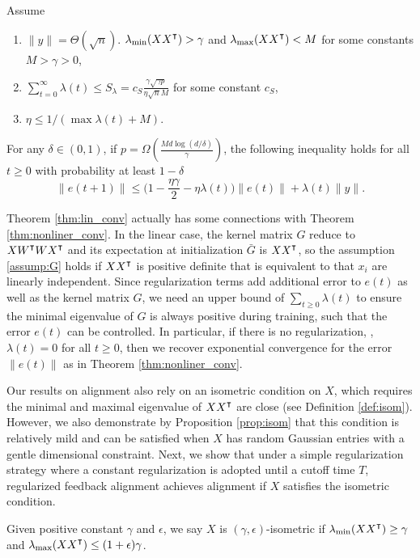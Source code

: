 \begin{theorem}
\label{thm:lin_conv}
Assume
\begin{enumerate}
\item $\|y\| = \Theta(\sqrt n)$. $\lambda_{\min}(XX\transpose)>\gamma$ and $\lambda_{\max}(XX\transpose)<M$ for some constants $M>\gamma>0$,
\item $\sum_{t=0}^\infty \lambda(t) \leq  S_\lambda = c_{S}\frac{\gamma\sqrt{\gamma p}}{\eta\sqrt{n}M}$ for some constant $c_{S}$,
\item $\eta \leq 1/(\max \lambda(t)+M)$.
\end{enumerate}
For any $\delta\in(0,1)$, if $p = \Omega(\frac{Md\log(d/\delta)}{\gamma})$, the following inequality holds for all $t\geq 0$ with probability at least $1-\delta$
\begin{equation}
\label{eq:reg_error_bd}
\|e(t+1)\|\leq \big(1-\frac{\eta\gamma}{2}-\eta\lambda(t)\big)\|e(t)\| + \lambda(t)\|y\|.
\end{equation} 
\end{theorem}

Theorem \ref{thm:lin_conv} actually has some connections with Theorem \ref{thm:nonliner_conv}. In the linear case, the kernel matrix $G$ reduce to $X W\transpose W X\transpose$ and its expectation at initialization $\bar{G}$ is $X X\transpose$, so the assumption \ref{assump:G} holds if $XX\transpose$ is positive definite that is equivalent to that $x_i$ are linearly independent. Since regularization terms add additional error to $e(t)$ as well as the kernel matrix $G$, we need an upper bound of $\sum_{t\geq 0}\lambda(t)$ to ensure the minimal eigenvalue of $G$ is always positive during training, such that the error $e(t)$ can be controlled. In particular, if there is no regularization, \ie, $\lambda(t)=0$ for all $t\geq 0$, then we recover exponential convergence for the error $\|e(t)\|$ as in Theorem \ref{thm:nonliner_conv}.

Our results on alignment also rely on an isometric condition on $X$, which requires the minimal and maximal eigenvalue of $XX\transpose$ are close (see Definition \ref{def:isom}). However, we also demonstrate by Proposition \ref{prop:isom} that this condition is relatively mild and can be satisfied when $X$ has random Gaussian entries with a gentle dimensional constraint. Next, we show that under a simple regularization strategy where a constant regularization is adopted until a cutoff time $T$, regularized feedback alignment achieves alignment if $X$ satisfies the isometric condition.
{}
\begin{definition}
\label{def:isom}
Given positive constant $\gamma$ and $\epsilon$, we say $X$ is $(\gamma, \epsilon)$-isometric if 
$\lambda_{\min}(XX\transpose)\geq\gamma$ and $\lambda_{\max}(XX\transpose)\leq(1+\epsilon)\gamma$.
\end{definition}

